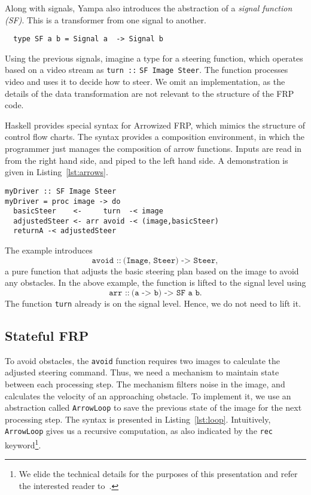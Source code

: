 Along with signals, Yampa also introduces the abstraction of a \textit{signal function (SF)}.
This is a transformer from one signal to another.

\vspace{0.2em}
\begin{lstlisting}
  type SF a b = Signal a  -> Signal b
\end{lstlisting}
\vspace{0.2em}

\noindent Using the previous signals, imagine a type for a steering function, which operates based on a video stream as \texttt{turn ::} \texttt{SF Image Steer}.
The function processes video and uses it to decide how to steer.
We omit an implementation, as the details of the data transformation are not relevant to the structure of the FRP code.

Haskell provides special syntax for Arrowized FRP, which mimics the structure of control flow charts.
The syntax provides a composition environment, in which the programmer just manages the composition of arrow functions.
Inputs are read in from the right hand side, and piped to the left hand side.
A demonstration is given in Listing~\ref{lst:arrows}.

\begin{lstlisting}[float,floatplacement=h!,caption=Basic Arrowized FRP syntax,label=lst:arrows]
myDriver :: SF Image Steer
myDriver = proc image -> do
  basicSteer    <-     turn  -< image
  adjustedSteer <- arr avoid -< (image,basicSteer)
  returnA -< adjustedSteer
\end{lstlisting}

The example introduces 
%
\begin{equation*}
  \texttt{avoid ::} \ \texttt{(Image, Steer) -> Steer},
\end{equation*}
%
a pure function that adjusts the basic steering plan based on the image to avoid any obstacles.
In the above example, the function is lifted to the signal level using
%
\begin{equation*}
   \texttt{arr ::} \ \texttt{(a -> b) -> SF a b}.
\end{equation*}
%
The function \texttt{turn} already is on the signal level. Hence, we do not need to lift it.

\subsection{Stateful FRP}

To avoid obstacles, the \texttt{avoid} function requires two images to calculate the adjusted steering command. 
Thus, we need a mechanism to maintain state between each processing step.
The mechanism filters noise in the image, and calculates the velocity of an approaching obstacle.
To implement it, we use an abstraction called \texttt{ArrowLoop} to  save the previous state of the image for the next processing step.
The syntax is presented in Listing~\ref{lst:loop}.
Intuitively, \texttt{ArrowLoop} gives us a recursive computation, as also indicated by the \texttt{rec} keyword\footnote{We elide the technical details for the purposes of this presentation and refer the interested reader to~\cite{paterson2001icfp}.}.



